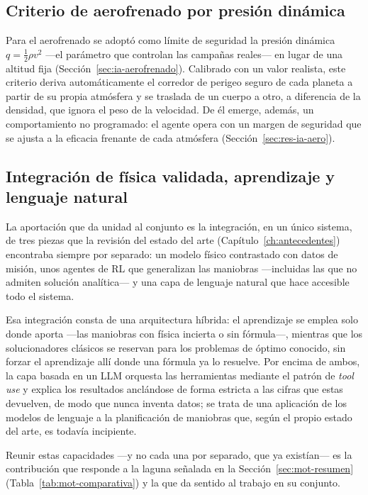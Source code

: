 \subsection{Criterio de aerofrenado por presión dinámica}

Para el aerofrenado se adoptó como límite de seguridad la presión dinámica $q=\tfrac{1}{2}\rho v^2$ ---el parámetro que controlan las campañas reales--- en lugar de una altitud fija (Sección~\ref{sec:ia-aerofrenado}). Calibrado con un valor realista, este criterio deriva automáticamente el corredor de perigeo seguro de cada planeta a partir de su propia atmósfera y se traslada de un cuerpo a otro, a diferencia de la densidad, que ignora el peso de la velocidad. De él emerge, además, un comportamiento no programado: el agente opera con un margen de seguridad que se ajusta a la eficacia frenante de cada atmósfera (Sección~\ref{sec:res-ia-aero}).

\subsection{Integración de física validada, aprendizaje y lenguaje natural}

La aportación que da unidad al conjunto es la integración, en un único sistema, de tres piezas que la revisión del estado del arte (Capítulo~\ref{ch:antecedentes}) encontraba siempre por separado: un modelo físico contrastado con datos de misión, unos agentes de \gls{RL} que generalizan las maniobras ---incluidas las que no admiten solución analítica--- y una capa de lenguaje natural que hace accesible todo el sistema.

Esa integración consta de una arquitectura híbrida: el aprendizaje se emplea solo donde aporta ---las maniobras con física incierta o sin fórmula---, mientras que los solucionadores clásicos se reservan para los problemas de óptimo conocido, sin forzar el aprendizaje allí donde una fórmula ya lo resuelve. Por encima de ambos, la capa basada en un \gls{LLM} orquesta las herramientas mediante el patrón de \textit{tool use} y explica los resultados anclándose de forma estricta a las cifras que estas devuelven, de modo que nunca inventa datos; se trata de una aplicación de los modelos de lenguaje a la planificación de maniobras que, según el propio estado del arte, es todavía incipiente.

Reunir estas capacidades ---y no cada una por separado, que ya existían--- es la contribución que responde a la laguna señalada en la Sección~\ref{sec:mot-resumen} (Tabla~\ref{tab:mot-comparativa}) y la que da sentido al trabajo en su conjunto.
